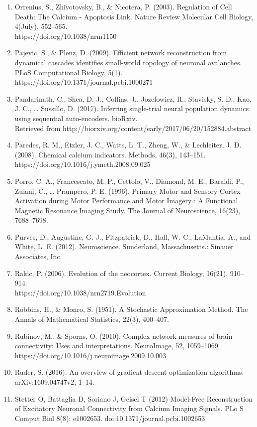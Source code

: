 \documentclass[11pt,titlepage]{article}
\begin{document}
\begin{spacing}{1}
\begin{enumerate}
\item Orrenius, S., Zhivotovsky, B., \& Nicotera, P. (2003). Regulation of Cell Death: The Calcium - Apoptosis Link. Nature Review Molecular Cell Biology, 4(July), 552–565.\\ https://doi.org/10.1038/nrm1150
\item Pajevic, S., \& Plenz, D. (2009). Efficient network reconstruction from dynamical cascades identifies small-world topology of neuronal avalanches. PLoS Computational Biology, 5(1). https://doi.org/10.1371/journal.pcbi.1000271
\item Pandarinath, C., Shea, D. J., Collins, J., Jozefowicz, R., Stavisky, S. D., Kao, J. C., … Sussillo, D. (2017). Inferring single-trial neural population dynamics using sequential auto-encoders. bioRxiv.\\Retrieved from http://biorxiv.org/content/early/2017/06/20/152884.abstract
\item Paredes, R. M., Etzler, J. C., Watts, L. T., Zheng, W., \& Lechleiter, J. D. (2008). Chemical calcium indicators. Methods, 46(3), 143–151. https://doi.org/10.1016/j.ymeth.2008.09.025
\item Porro, C. A., Francescato, M. P., Cettolo, V., Diamond, M. E., Baraldi, P., Zuiani, C., … Prampero, P. E. (1996). Primary Motor and Sensory Cortex Activation during Motor Performance and Motor Imagery : A Functional Magnetic Resonance Imaging Study. The Journal of Neuroscience, 16(23), 7688–7698.
\item Purves, D., Augustine, G. J., Fitzpatrick, D., Hall, W. C., LaMantia, A., and White, L. E. (2012). Neuroscience. Sunderland, Massachusetts.: Sinauer Associates, Inc.
\item Rakic, P. (2006). Evolution of the neocortex. Current Biology, 16(21), 910–914. \\https://doi.org/10.1038/nrn2719.Evolution
\item Robbins, H., \& Monro, S. (1951). A Stochastic Approximation Method. The Annals of Mathematical Statistics, 22(3), 400–407.
\item Rubinov, M., \& Sporns, O. (2010). Complex network measures of brain connectivity: Uses and interpretations. NeuroImage, 52, 1059–1069.\\ https://doi.org/10.1016/j.neuroimage.2009.10.003
\item Ruder, S. (2016). An overview of gradient descent optimization algorithms.\\ arXiv:1609.04747v2, 1–14.
\item Stetter  O,  Battaglia  D,  Soriano  J,  Geisel  T  (2012)  Model-Free  Reconstruction  of  Excitatory  Neuronal  Connectivity  from  Calcium  Imaging  Signals.  PLo S Comput  Biol  8(8):  e1002653. doi:10.1371/journal.pcbi.1002653

\end{enumerate}
\end{spacing}
\end{document}
